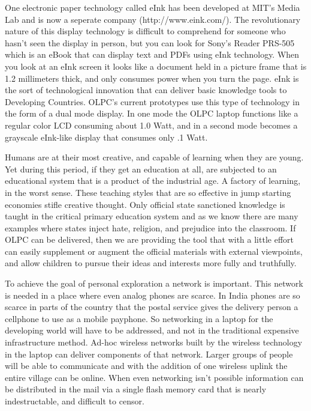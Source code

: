 \documentclass[12pt,twoside,letterpaper]{article}
\begin{document}
One electronic paper technology called eInk has been developed at MIT's Media Lab and is now a seperate company (http://www.eink.com/). The revolutionary nature of this display technology is difficult to comprehend for someone who hasn't seen the display in person, but you can look for Sony's Reader PRS-505 which is an eBook that can display text and PDFs using eInk technology. When you look at an eInk screen it looks like a document held in a picture frame that is 1.2 millimeters thick, and only consumes power when you turn the page. eInk is the sort of technological innovation that can deliver basic knowledge tools to Developing Countries. OLPC's current prototypes use this type of technology in the form of a dual mode display. In one mode the OLPC laptop functions like a regular color LCD consuming about 1.0 Watt, and in a second mode becomes a grayscale eInk-like display that consumes only .1 Watt.

Humans are at their most creative, and capable of learning when they are young. Yet during this period, if they get an education at all, are subjected to an educational system that is a product of the industrial age\cite{1245651}. A factory of learning, in the worst sense. These teaching styles that are so effective in jump starting economies stifle creative thought. Only official state sanctioned knowledge is taught in the critical primary education system and as we know there are many examples where states inject hate, religion, and prejudice into the classroom. If OLPC can be delivered, then we are providing the tool that with a little effort can easily supplement or augment the official materials with external viewpoints, and allow children to pursue their ideas and interests more fully and truthfully.

To achieve the goal of personal exploration a network is important. This network is needed in a place where even analog phones are scarce. In India phones are so scarce in parts of the country that the postal service gives the delivery person a cellphone to use as a mobile payphone. So networking in a laptop for the developing world will have to be addressed, and not in the traditional expensive infrastructure method\cite{303858}. Ad-hoc wireless networks built by the wireless technology in the laptop can deliver components of that network. Larger groups of people will be able to communicate and with the addition of one wireless uplink the entire village can be online. When even networking isn't possible information can be distributed in the mail via a single flash memory card that is nearly indestructable, and difficult to censor.
\end{document}
